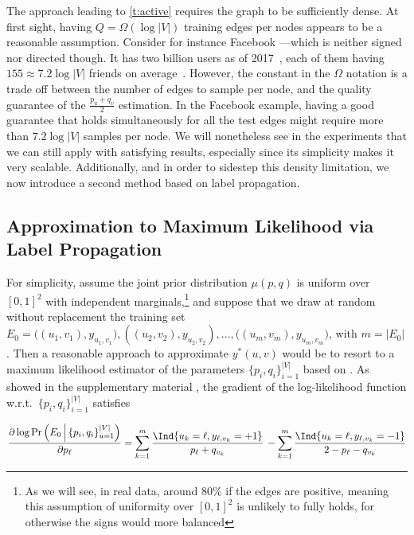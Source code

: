 \medskip

The approach leading to \autoref{t:active} requires the graph to be sufficiently dense. At first sight,
having $Q = \Omega(\log|V|)$ training edges per nodes appears to be a reasonable assumption.
Consider for instance Facebook ---which is neither signed nor directed though. It has two billion
users as of 2017~,
each of them having $155\approx 7.2\log|V|$ friends on average~\autocite{facebookFriend16}. However,
the constant in the $\Omega$ notation is a trade off between the number of edges to sample per
node, and the quality guarantee of the $\frac{p_u+q_v}{2}$ estimation. In the Facebook example,
having a good guarantee that holds simultaneously for all the test edges might require more than
$7.2\log|V|$ samples per node. We will nonetheless see in the experiments that we can still apply
\usrule{} with satisfying results, especially since its simplicity makes it very scalable.
Additionally, and in order to sidestep this density limitation, we now introduce a second method
based on label propagation.

\subsection{Approximation to Maximum Likelihood via Label Propagation}\label{ss:passive}

For simplicity, assume the joint prior distribution $\mu(p,q)$ is uniform over $[0,1]^2$ with
independent marginals,\footnote{As we will see, in real data, around $80\%$ if the edges are
positive, meaning this assumption of uniformity over $[0,1]^2$ is unlikely to fully holds, for
otherwise the signs would more balanced} and suppose that we draw at random without replacement the
training set $E_0
= \big((u_1,v_1),y_{u_1,v_1}), ((u_2,v_2),y_{u_2,v_2}), \ldots, ((u_m,v_m),y_{u_m,v_m}\big)$, with
$m = |E_0|$. Then a reasonable approach to approximate $y^*(u,v)$ would be to resort to a maximum
likelihood estimator of the parameters $\{p_i, q_i\}_{i=1}^{|V|}$ based on \trainset{}.
As showed in the supplementary material , the gradient of the
log-likelihood function w.r.t.\ $\{p_i, q_i\}_{i=1}^{|V|}$ satisfies

\begin{equation}\label{e:mlp}
\frac{\partial \log \Pr\left(E_0 \,\Big|\, \{p_i, q_i\}_{u=1}^{|V|}\right)}{\partial p_{\ell}}
=
\sum_{k=1}^m
\frac{\Ind{u_k = \ell,y_{\ell,v_k}=+1}}{p_{\ell}+q_{v_k}}\,
- \sum_{k=1}^m
\frac{\Ind{u_k = \ell,y_{\ell,v_k}=-1}}{2-p_{\ell}-q_{v_k}}
\end{equation}

